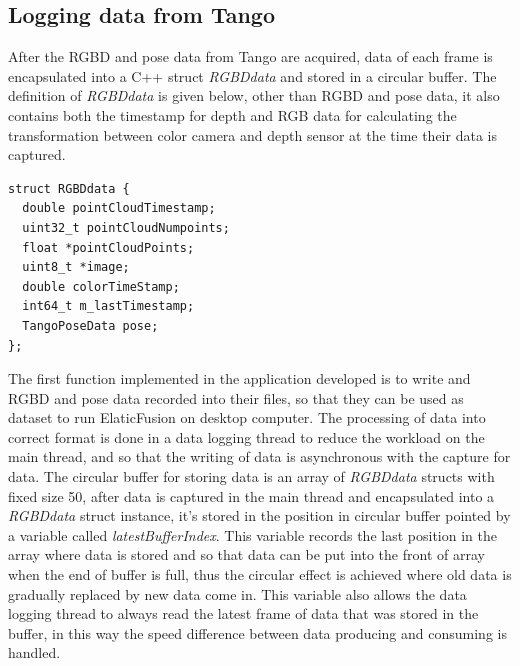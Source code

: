 \documentclass[12pt,twoside]{article}
\begin{document}
\subsection{Logging data from Tango}
After the RGBD and pose data from Tango are acquired, data of each frame is encapsulated into a C++ struct \textit{RGBDdata} and stored in a circular buffer. The definition of \textit{RGBDdata} is given below, other than RGBD and pose data, it also contains both the timestamp for depth and RGB data for calculating the transformation between color camera and depth sensor at the time their data is captured.\\
\begin{lstlisting}
struct RGBDdata {
  double pointCloudTimestamp;
  uint32_t pointCloudNumpoints;
  float *pointCloudPoints;
  uint8_t *image;
  double colorTimeStamp;
  int64_t m_lastTimestamp;
  TangoPoseData pose;
};
\end{lstlisting}
The first function implemented in the application developed is to write and RGBD and pose data recorded into their files, so that they can be used as dataset to run ElaticFusion on desktop computer. The processing of data into correct format is done in a data logging thread to reduce the workload on the main thread, and so that the writing of data is asynchronous with the capture for data. The circular buffer for storing data is an array of \textit{RGBDdata} structs with fixed size 50, after data is captured in the main thread and encapsulated into a \textit{RGBDdata} struct instance, it's stored in the position in circular buffer pointed by a variable called 
\textit{latestBufferIndex}. This variable records the last position in the array where data is stored and so that data can be put into the front of array when the end of buffer is full, thus the circular effect is achieved where old data is gradually replaced by new data come in. This variable also allows the data logging thread to always read the latest frame of data that was stored in the buffer, in this way the speed difference between data producing and consuming is handled.\\
\\
\end{document}
